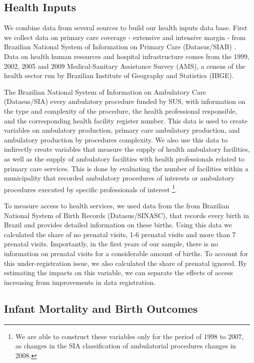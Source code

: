 

\subsection{Health Inputs}

We combine data from several sources to build our health inputs data base. First we collect data on primary care coverage - extensive and intensive margin -  from Brazilian National System of Information on Primary Care (Datasus/SIAB) . Data on health human resources and hospital infrastructure comes from the 1999, 2002, 2005 and 2009 Medical-Sanitary Assistance Survey (AMS), a census of the health sector run by Brazilian Institute of Geography and Statistics (IBGE). 

The Brazilian National System of Information on Ambulatory Care (Datasus/SIA) every ambulatory procedure funded by SUS, with information on the type and complexity of the procedure, the health professional responsible, and the corresponding health facility register number. This data is used to create variables on ambulatory production, primary care ambulatory production, and ambulatory production by procedures complexity. We also use this data to indirectly create variables that measure the supply of health ambulatory facilities, as well as the supply of ambulatory facilities with health professionals related to primary care services. This is done by evaluating the number of facilities within a municipality that recorded ambulatory procedures of interests or ambulatory procedures executed by specific professionals of interest \footnote{We are able to construct these variables only for the period of 1998 to 2007, as changes in the SIA classification of ambulatorial procedures changes in 2008.}.

To measure access to health services, we used data from the from Brazilian National System of Birth Records (Datasus/SINASC), that records every birth in Brazil and provides detailed information on these births. Using this data we calculated the share of no prenatal visits, 1-6 prenatal visits and more than 7 prenatal visits. Importantly, in the first years of our sample, there is no information on prenatal visits for a considerable amount of births. To account for this under-registration issue, we also calculated the share of prenatal ignored. By estimating the impacts on this variable, we can separate the effects of access increasing from improvements in data registration.


\subsection{Infant Mortality and Birth Outcomes}

